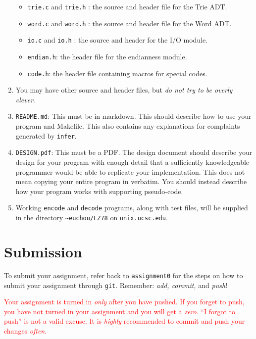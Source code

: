 \documentclass{article}
\begin{document}
\begin{enumerate}
\begin{itemize}
            \item \texttt{trie.c} and \texttt{trie.h} : the source and header
                file for the Trie ADT.

            \item \texttt{word.c} and \texttt{word.h} : the source and header
                file for the Word ADT.

            \item \texttt{io.c} and \texttt{io.h} : the source and header for
                the I/O module.

            \item \texttt{endian.h}: the header file for the endianness module.

            \item \texttt{code.h}: the header file containing macros for special
                codes.
        \end{itemize}

    \item You may have other source and header files, but
        \emph{do not try to be overly clever}.

    \item \texttt{README.md}: This must be in markdown. This should
        describe how to use your program and Makefile. This also contains any
        explanations for complaints generated by \texttt{infer}.

    \item \texttt{DESIGN.pdf}: This must be a PDF. The design document should
        describe your design for your program with enough detail that a
        sufficiently knowledgeable programmer would be able to replicate your
        implementation. This does not mean copying your entire program in
        verbatim. You should instead describe how your program works with
        supporting pseudo-code.

    \item Working \texttt{encode} and \texttt{decode} programs, along with test
        files, will be supplied in the directory \verb+~euchou/LZ78+ on
        \texttt{unix.ucsc.edu}.
\end{enumerate}


\section{Submission}

To submit your assignment, refer back to \texttt{assignment0} for the steps on
how to submit your assignment through \texttt{git}. Remember:
\emph{add, commit,} and \emph{push}!

\textcolor{red}{Your assignment is turned in \emph{only} after you have pushed.
If you forget to push, you have not turned in your assignment and you will get
a \emph{zero}. ``I forgot to push'' is not a valid excuse. It is \emph{highly}
recommended to commit and push your changes \emph{often}.}
\end{document}
